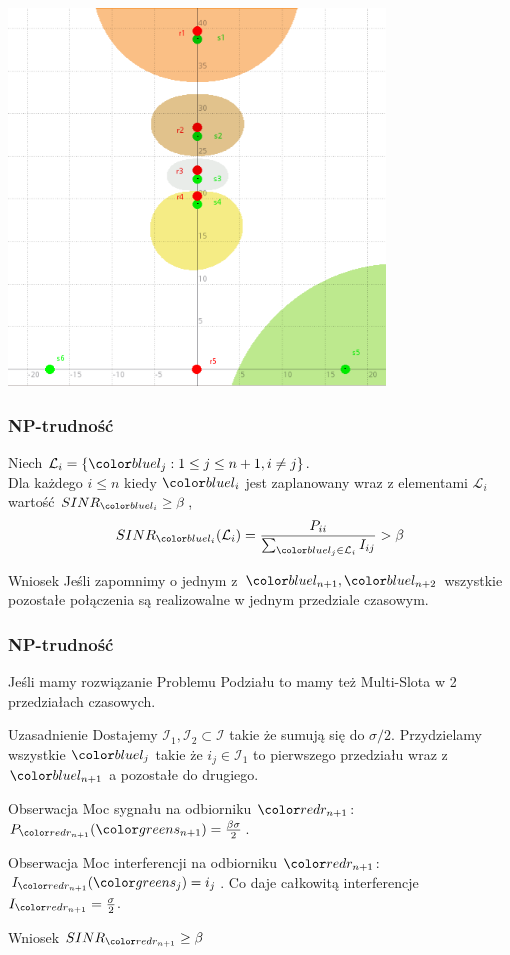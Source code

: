 \documentclass[polish, t,10pt]{beamer}
\begin{document}
\begin{frame}
    \centering
    \includegraphics[width=0.75\textwidth]{pictures/np-placement3.png}
\end{frame}
\begin{frame}
    \frametitle{NP-trudność}
    \begin{lemma}
        Niech $\mathcal{L}_i = \{\lj: 1 \leq j \leq n + 1, i \neq j\}$.\\
        Dla każdego $i \leq n$ kiedy $\li$ jest zaplanowany wraz z elementami $\mathcal{L}_i$ wartość $SINR_\li \ge \beta$,
        $$
            SINR_\li(\mathcal{L}_i) = \frac{P_{ii}}{\sum_{\lj \in \mathcal{L}_i} I_{ij}} > \beta
        $$
    \end{lemma}
    \pause
    \begin{block}{Wniosek}
        Jeśli zapomnimy o jednym z $\lno, \lnt$ wszystkie pozostałe połączenia są realizowalne w jednym przedziale czasowym.
    \end{block}
\end{frame}
\begin{frame}
    \frametitle{NP-trudność}
    Jeśli mamy rozwiązanie Problemu Podziału to mamy też Multi-Slota w 2 przedziałach czasowych.
    \begin{block}{Uzasadnienie}
        Dostajemy $\mathcal{I}_1, \mathcal{I}_2 \subset \mathcal{I}$ takie że sumują się do $\sigma/2$. Przydzielamy wszystkie $\lj$ takie że $i_j \in \mathcal{I}_1$ to pierwszego przedziału wraz z $\lno$ a pozostałe do drugiego.
    \end{block}
    \pause
    \begin{block}{Obserwacja}
        Moc sygnału na odbiorniku $\rno$: $P_\rno(\sno) = \frac{\beta\sigma}{2}$.
    \end{block}
    \pause
    \begin{block}{Obserwacja}
        Moc interferencji na odbiorniku $\rno$: $I_\rno(\sj) = i_j$. Co daje całkowitą interferencje $I_\rno = \frac{\sigma}{2}$.
    \end{block}
    \pause
    \begin{block}{Wniosek}
        $SINR_\rno \geq \beta$
    \end{block}
\end{frame}
\end{document}
